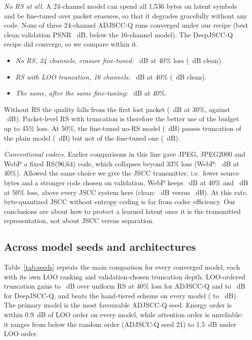 \emph{No RS at all.} A 24-channel model can spend all 1,536 bytes on latent symbols and be fine-tuned
over packet erasures, so that it degrades gracefully without any code. None of three 24-channel ADJSCC-Q
runs converged under our recipe (best clean validation PSNR \NoRsBestValClean~dB, below the 16-channel
model). The DeepJSCC-Q recipe did converge, so we compare within it.
\begin{itemize}
\item \emph{No RS, 24 channels, erasure fine-tuned:} \NoRsDeepForty~dB at 40\% loss (\NoRsDeepClean~dB clean).
\item \emph{RS with LOO truncation, 16 channels:} \RsDeepTruncForty~dB at 40\% (\RsDeepClean~dB clean).
\item \emph{The same, after the same fine-tuning:} \RsDeepRobustTruncForty~dB at 40\%.
\end{itemize}
Without RS the quality falls from the first lost packet (\NoRsDeepThirty~dB at 30\%, against
\RsDeepTruncThirty~dB). Packet-level RS with truncation is therefore the better use of the budget up to
45\% loss. At 50\%, the fine-tuned no-RS model (\NoRsDeepFifty~dB) passes truncation of the plain model
(\RsDeepTruncFifty~dB) but not of the fine-tuned one (\RsDeepRobustTruncFifty~dB).

\emph{Conventional codecs.} Earlier comparisons in this line gave JPEG, JPEG2000 and WebP a fixed
RS(96,64) code, which collapses beyond 33\% loss (WebP: \WebpFixedForty~dB at 40\%). Allowed the same
choice we give the JSCC transmitter, i.e.\ fewer source bytes and a stronger code chosen on validation, WebP
keeps \WebpAdaptiveForty~dB at 40\% and \WebpAdaptiveFifty~dB at 50\% loss, above every JSCC system
here (clean: \WebpAdaptiveZero~dB versus \CleanPsnr~dB). At this rate, byte-quantized JSCC without entropy
coding is far from codec efficiency. Our conclusions are about how to protect a learned latent once it
is the transmitted representation, not about JSCC versus separation.

\subsection{Across model seeds and architectures}
Table~\ref{tab:seeds} repeats the main comparison for every converged model, each with its own LOO
ranking and validation-chosen truncation depth. LOO-ordered truncation gains \TruncGainMinAdj{} to
\TruncGainMaxAdj~dB over uniform RS at 40\% loss for ADJSCC-Q and \TruncGainMinDeep{} to
\TruncGainMaxDeep~dB for DeepJSCC-Q, and beats the hand-tiered scheme on every model
(\TruncOverHandMinAll{} to \TruncOverHandMaxAll~dB). The primary model is the most favourable ADJSCC-Q
seed. Energy order is within 0.9~dB of LOO order on every model, while attention order is unreliable:
it ranges from below the random order (ADJSCC-Q seed 21) to 1.5~dB under LOO order.
\begin{table}[t]\centering\caption{Test PSNR (dB) at 40\% loss across models}\label{tab:seeds}
\resizebox{\columnwidth}{!}{}
\end{table}

